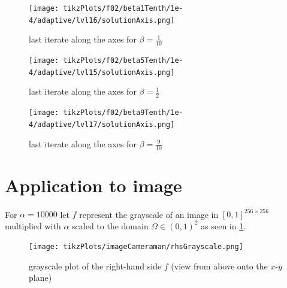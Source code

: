 \documentclass[draft=false,twoside,12pt]{scrreprt}
\begin{document}
\vspace{-\parskip}
\begin{minipage}[t]{0.3\textwidth}
  \begin{figure}[H]
	  \centering
		\texttt{[image: tikzPlots/f02/beta1Tenth/1e-4/adaptive/lvl16/solutionAxis.png]} 
      \caption{last iterate along the axes for $\beta=\frac{1}{10}$}
  \end{figure}
\end{minipage}
\hfill
\vline
\hfill
\begin{minipage}[t]{0.3\textwidth}
  \begin{figure}[H]
	  \centering
		\texttt{[image: tikzPlots/f02/beta5Tenth/1e-4/adaptive/lvl15/solutionAxis.png]} 
      \caption{last iterate along the axes for $\beta=\frac{1}{2}$}
  \end{figure}
\end{minipage}
\hfill
\vline
\hfill
\begin{minipage}[t]{0.3\textwidth}
  \begin{figure}[H]
	  \centering
		\texttt{[image: tikzPlots/f02/beta9Tenth/1e-4/adaptive/lvl17/solutionAxis.png]} 
      \caption{last iterate along the axes for $\beta=\frac{9}{10}$}
  \end{figure}
\end{minipage}

\section{Application to image}
For $\alpha = 10000$ let $f$ represent the grayscale of an image in
$[0,1]^{256\times 256}$ multiplied with $\alpha$ scaled to the domain
$\Omega\in(0,1)^2$ as seen in \cref{fig:rhsCameraman}.

\begin{figure}[H]
	\centering
	\texttt{[image: tikzPlots/imageCameraman/rhsGrayscale.png]}
  \caption{grayscale plot of the right-hand side $f$ (view from above onto the
  $x$-$y$ plane)}
  \label{fig:rhsCameraman}
\end{figure}
\end{document}
